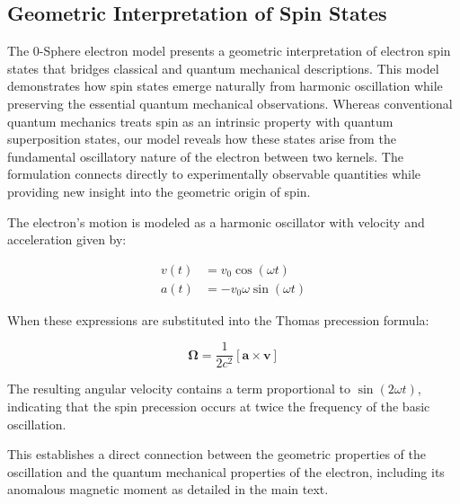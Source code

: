 \documentclass[%
 reprint,
 amsmath,amssymb,
 aps,
]{revtex4-1}
\numberwithin{equation}{section}%
\begin{document}
\subsection{Geometric Interpretation of Spin States}
\label{sec:GeometricInterpretationOf}

The 0-Sphere electron model presents a geometric interpretation of electron spin states that bridges classical and quantum mechanical descriptions. This model demonstrates how spin states emerge naturally from harmonic oscillation while preserving the essential quantum mechanical observations. Whereas conventional quantum mechanics treats spin as an intrinsic property with quantum superposition states, our model reveals how these states arise from the fundamental oscillatory nature of the electron between two kernels. The formulation connects directly to experimentally observable quantities while providing new insight into the geometric origin of spin.

The electron's motion is modeled as a harmonic oscillator with velocity and acceleration given by:

\begin{equation}
\begin{split}
v(t) &= v_0 \cos(\omega t) \\
a(t) &= -v_0\omega \sin(\omega t)
\end{split}
\label{eq:harmonic_motion}
\end{equation}

When these expressions are substituted into the Thomas precession formula:

\begin{equation}
\mathbf{\Omega} = \frac{1}{2c^2}[\mathbf{a} \times \mathbf{v}]
\label{eq:thomas_precession}
\end{equation}

The resulting angular velocity contains a term proportional to $\sin(2\omega t)$, indicating that the spin precession occurs at twice the frequency of the basic oscillation.

This establishes a direct connection between the geometric properties of the oscillation and the quantum mechanical properties of the electron, including its anomalous magnetic moment as detailed in the main text.


\end{document}
